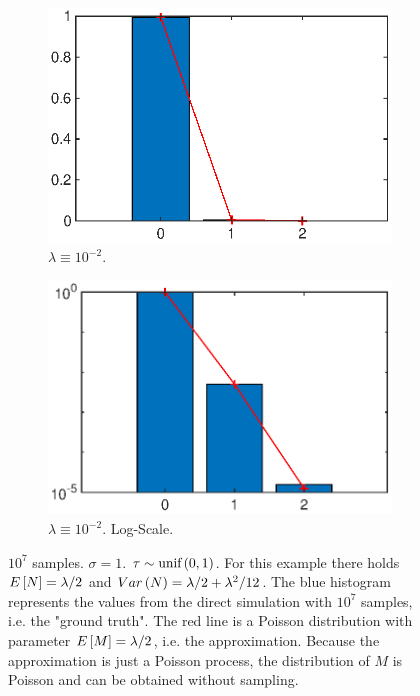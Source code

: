 \documentclass{amsart}
\numberwithin{equation}{section}
\begin{document}
\begin{figure}[ht]
\begin{subfigure}[t]{0.475\textwidth}
        \includegraphics[width=\textwidth]{poissproc01_2_1.eps}
        \caption{$\lambda \equiv 10^{-2}$.}
    \end{subfigure}
    \hfill
    \begin{subfigure}[t]{0.475\textwidth}
        \centering
        \includegraphics[width=\textwidth]{poissproc01_2_2.eps}
        \caption{$\lambda \equiv 10^{-2}$. Log-Scale.}
    \end{subfigure}
    \caption{$10^7$ samples. $\sigma = 1$. $\tau \sim \text{unif}\left(0,1\right)$. For this example there holds $E\left[N\right] = \lambda / 2$ and $Var\left(N\right) = \lambda/2 + \lambda^2/12$. The blue histogram represents the values from the direct simulation with $10^7$ samples, i.e. the "ground truth". The red line is a Poisson distribution with parameter $E\left[M\right] = \lambda / 2$, i.e. the approximation. Because the approximation is just a Poisson process, the distribution of $M$ is Poisson and can be obtained without sampling.}
    \label{fig:numPoissProcOne}
\end{figure}
\end{document}

